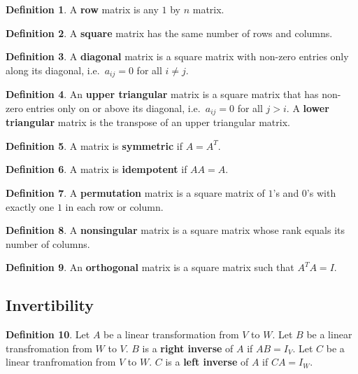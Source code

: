 \documentclass[12pt,reqno]{amsart}
\theoremstyle{definition}
\newtheorem{definition}{Definition}[section]
\begin{document}
\begin{definition}
  A \textbf{row} matrix is any $1$ by $n$ matrix.
\end{definition}

\begin{definition}
  A \textbf{square} matrix has the same number of rows and columns.
\end{definition}

\begin{definition}
  A \textbf{diagonal} matrix is a square matrix with non-zero entries
  only along its diagonal, i.e.\ $a_{ij} = 0$ for all $i \neq j$. 
\end{definition}

\begin{definition}
  An \textbf{upper triangular} matrix is a square matrix that has
  non-zero entries only on or above its diagonal, i.e.\ $a_{ij} = 0$
  for all $j>i$. A \textbf{lower triangular} matrix is the transpose
  of an upper triangular matrix.
\end{definition}

\begin{definition}
  A matrix is \textbf{symmetric} if $A = A^T$.
\end{definition}

\begin{definition}
  A matrix is \textbf{idempotent} if $AA = A$.
\end{definition}

\begin{definition}
  A \textbf{permutation} matrix is a square matrix of $1$'s and $0$'s
  with exactly one $1$ in each row or column.  
\end{definition}

\begin{definition}
  A \textbf{nonsingular} matrix is a square matrix whose rank equals
  its number of columns.
\end{definition}

\begin{definition}
  An \textbf{orthogonal} matrix is a square matrix such that $A^TA =
  I$.
\end{definition}

\subsection{Invertibility}

\begin{definition}
  Let $A$ be a linear transformation from $V$ to $W$. Let $B$ be a
  linear transfromation from $W$ to $V$. $B$ is a \textbf{right
    inverse} of $A$ if $AB = I_V$. Let $C$ be a linear tranfromation
  from $V$ to $W$. $C$ is a \textbf{left inverse} of $A$ if $CA = I_W$. 
\end{definition}  
\end{document}
